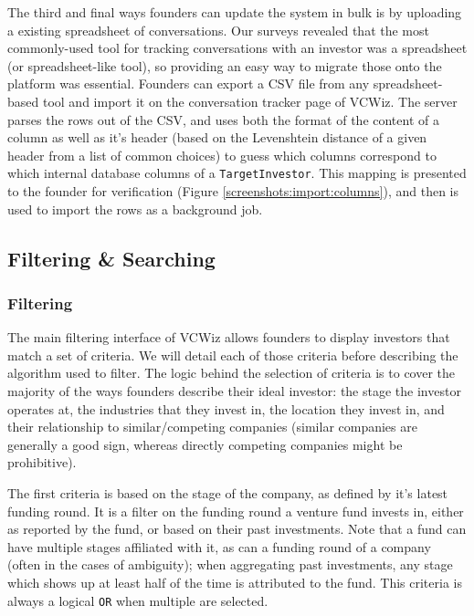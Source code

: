 The third and final ways founders can update the system in bulk is by uploading a existing spreadsheet of conversations. Our surveys revealed that the most commonly-used tool for tracking conversations with an investor was a spreadsheet (or spreadsheet-like tool), so providing an easy way to migrate those onto the platform was essential. Founders can export a CSV file from any spreadsheet-based tool and import it on the conversation tracker page of VCWiz. The server parses the rows out of the CSV, and uses both the format of the content of a column as well as it's header (based on the Levenshtein distance \cite{1966SPhD...10..707L} of a given header from a list of common choices) to guess which columns correspond to which internal database columns of a \texttt{TargetInvestor}. This mapping is presented to the founder for verification (Figure \ref{screenshots:import:columns}), and then is used to import the rows as a background job.

\subsection{Filtering \& Searching}
\label{ch4:filtering}

\subsubsection{Filtering}

The main filtering interface of VCWiz allows founders to display investors that match a set of criteria. We will detail each of those criteria before describing the algorithm used to filter. The logic behind the selection of criteria is to cover the majority of the ways founders describe their ideal investor: the stage the investor operates at, the industries that they invest in, the location they invest in, and their relationship to similar/competing companies (similar companies are generally a good sign, whereas directly competing companies might be prohibitive).

The first criteria is based on the stage of the company, as defined by it's latest funding round. It is a filter on the funding round a venture fund invests in, either as reported by the fund, or based on their past investments. Note that a fund can have multiple stages affiliated with it, as can a funding round of a company (often in the cases of ambiguity); when aggregating past investments, any stage which shows up at least half of the time is attributed to the fund. This criteria is always a logical \texttt{OR} when multiple are selected.

